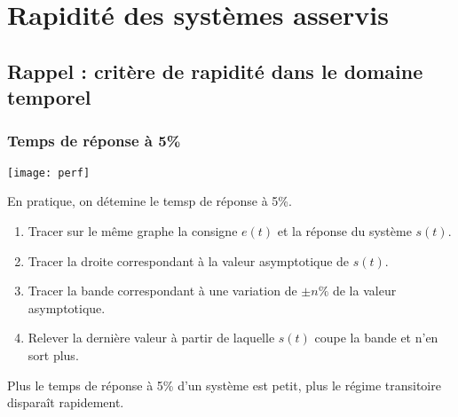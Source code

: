 \section{Rapidité des systèmes asservis}


\subsection{Rappel : critère de rapidité dans le domaine temporel}

\subsubsection{Temps de réponse à 5\%}

\begin{marginfigure}
\centering
\texttt{[image: perf]}
\end{marginfigure}

\begin{methode}%
En pratique, on détemine le temsp de réponse à 5\%.
\begin{enumerate}
\item Tracer sur le même graphe la consigne $e(t)$ et la réponse du système
$s(t)$.
\item Tracer la droite correspondant à la valeur asymptotique de $s(t)$.
\item Tracer la bande correspondant à une variation de $\pm n\%$ de la valeur
asymptotique.
\item Relever la dernière valeur à partir de laquelle $s(t)$ coupe la bande et
n'en sort plus.
\end{enumerate}
\end{methode}

\begin{resultat}
Plus le temps de réponse à 5\% d'un système est petit, plus le régime transitoire disparaît rapidement. 
\end{resultat}


